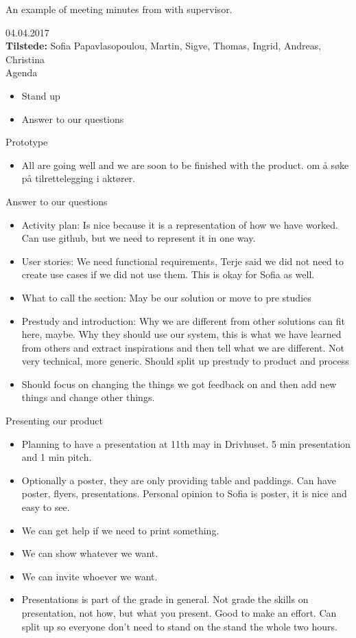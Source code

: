An example of meeting minutes from with supervisor.

{\huge{04.04.2017}}\\
\textbf{Tilstede:} Sofia Papavlasopoulou, Martin, Sigve, Thomas, Ingrid, Andreas, Christina\\


{\Large{Agenda}}
\begin{itemize} 
    \item Stand up
    \item Answer to our questions
\end{itemize} 

{\large{Prototype}}
\begin{itemize}  
    \item All are going well and we are soon to be finished with the product. om å søke på tilrettelegging i aktører.
\end{itemize}

{\large{Answer to our questions}}
\begin{itemize}  
    \item Activity plan: Is nice because it is a representation of how we have worked. Can use github, but we need to represent it in one way.
    \item User stories: We need functional requirements, Terje said we did not need to create use cases if we did not use them. This is okay for Sofia as well.
    \item What to call the section: May be our solution or move to pre studies
    \item Prestudy and introduction: Why we are different from other solutions can fit here, maybe. Why they should use our system, this is what we have learned from others and extract inspirations and then tell what we are different. Not very technical, more generic. Should split up prestudy to product and process
    \item Should focus on changing the things we got feedback on and then add new things and change other things.
\end{itemize}

{\large{Presenting our product}}
\begin{itemize}  
    \item Planning to have a presentation at 11th may in Drivhuset. 5 min presentation and 1 min pitch.
    \item Optionally a poster, they are only providing table and paddings. Can have poster, flyers, presentations. Personal opinion to Sofia is poster, it is nice and easy to see. 
    \item We can get help if we need to print something.
    \item We can show whatever we want. 
    \item We can invite whoever we want.
    \item Presentations is part of the grade in general. Not grade the skills on presentation, not how, but what you present. Good to make an effort.
Can split up so everyone don’t need to stand on the stand the whole two hours.
\end{itemize}

